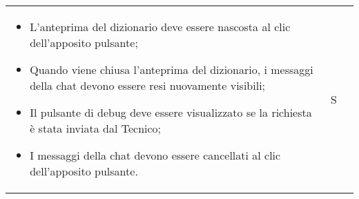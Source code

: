 \begin{adjustwidth}{-0.5cm}{-0.5cm}
\begin{longtable}{|P{1.5cm}|>{\raggedright}P{9.5cm}|>{\arraybackslash}P{1.5cm}|}
\begin{itemize}
      \item L'anteprima del dizionario deve essere nascosta al clic dell'apposito pulsante;
      \item Quando viene chiusa l'anteprima del dizionario, i messaggi della chat devono essere resi nuovamente visibili;
      \item Il pulsante di debug deve essere visualizzato se la richiesta è stata inviata dal Tecnico;
      \item I messaggi della chat devono essere cancellati al clic dell'apposito pulsante.
    \end{itemize} & S \\
	\end{longtable}
\end{adjustwidth}
\egroup
